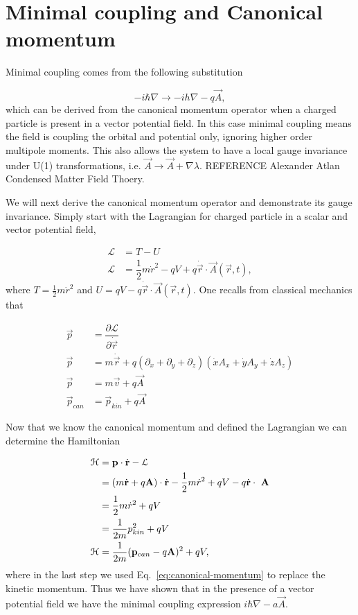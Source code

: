 \section{Minimal coupling and Canonical momentum}
Minimal coupling comes from the following substitution

\begin{equation}
  -i\hbar\nabla \rightarrow -ih\nabla - q\vec{A},
\end{equation}
which can be derived from the canonical momentum operator when a charged particle is present in a vector potential field.
In this case minimal coupling means the field is coupling the orbital and potential only, ignoring higher order multipole moments.
This also allows the system to have a local gauge invariance under U(1) transformations, i.e. $\vec{A} \rightarrow \vec{A} + \nabla\lambda$.
REFERENCE Alexander Atlan Condensed Matter Field Thoery.

We will next derive the canonical momentum operator and demonstrate its gauge invariance.
Simply start with the Lagrangian for charged particle in a scalar and vector potential field,

\begin{align}
  \mathcal{L} &= T- U \nonumber \\
  \mathcal{L} &= \dfrac{1}{2} m \dot{r}^2 - qV + q \dot{\vec{r}} \cdot \vec{A}(\vec{r},t),
\end{align}
where $T = \tfrac{1}{2} m \dot{r}^2$ and $U = qV - q \dot{\vec{r}} \cdot \vec{A}(\vec{r},t)$.
One recalls from classical mechanics that

\begin{align}
  \vec{p} &= \dfrac{\partial\mathcal{L}}{\partial \dot{\vec{r}}} \nonumber \\
  \vec{p} &= m \dot{\vec{r}} + q \left( \partial_{\dot{x}} + \partial_{\dot{y}} + \partial_{\dot{z}} \right) \left(\dot{x} A_x + \dot{y} A_y + \dot{z} A_z \right) \nonumber \\
  \vec{p} &= m \vec{v} + q \vec{A} \nonumber \\
  \vec{p}_{can} &= \vec{p}_{kin} + q \vec{A}
  \label{eq:canonical-momentum}
\end{align}

Now that we know the canonical momentum and defined the Lagrangian we can determine the Hamiltonian

\begin{align}
  \mathcal{H} &= \mathbf{p} \cdot \dot{\mathbf{r}} - \mathcal{L} \nonumber \\
  &= (m \dot{\mathbf{r}} + q \mathbf{A}) \cdot \dot{\mathbf{r}} - \dfrac{1}{2} m \dot{r}^2 + q V - q \dot{\mathbf{r}}\cdot\ \mathbf{A} \nonumber \\
  &= \dfrac{1}{2} m \dot{r}^2 + q V \nonumber \\
  &= \dfrac{1}{2m}  p_{kin}^2 + q V \nonumber \\
  \mathcal{H} &= \dfrac{1}{2m} (\mathbf{p}_{can} - q \mathbf{A})^2 + q V,
\end{align}
where in the last step we used Eq.~\eqref{eq:canonical-momentum} to replace the kinetic momentum.
Thus we have shown that in the presence of a vector potential field we have the minimal coupling expression $i\hbar\nabla - a\vec{A}$.

